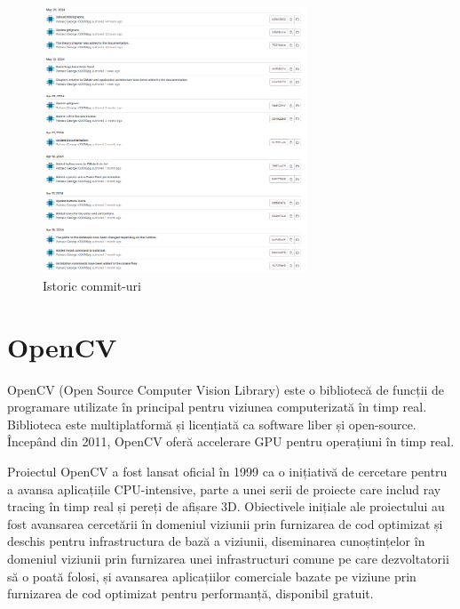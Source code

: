 \documentclass[a4paper,12pt]{report}
\begin{document}
\begin{figure}[h!]
    \centering
    \includegraphics[width=0.7\textwidth]{images/commits.jpg}
    \caption{Istoric commit-uri}
\end{figure}
\FloatBarrier

\section{OpenCV}
OpenCV (Open Source Computer Vision Library) este o bibliotecă de funcții de programare utilizate în principal pentru viziunea computerizată în timp real. Biblioteca este multiplatformă și licențiată ca software liber și open-source. Începând din 2011, OpenCV oferă accelerare GPU pentru operațiuni în timp real.

Proiectul OpenCV a fost lansat oficial în 1999 ca o inițiativă de cercetare pentru a avansa aplicațiile CPU-intensive, parte a unei serii de proiecte care includ ray tracing în timp real și pereți de afișare 3D. Obiectivele inițiale ale proiectului au fost avansarea cercetării în domeniul viziunii prin furnizarea de cod optimizat și deschis pentru infrastructura de bază a viziunii, diseminarea cunoștințelor în domeniul viziunii prin furnizarea unei infrastructuri comune pe care dezvoltatorii să o poată folosi, și avansarea aplicațiilor comerciale bazate pe viziune prin furnizarea de cod optimizat pentru performanță, disponibil gratuit.
\end{document}
